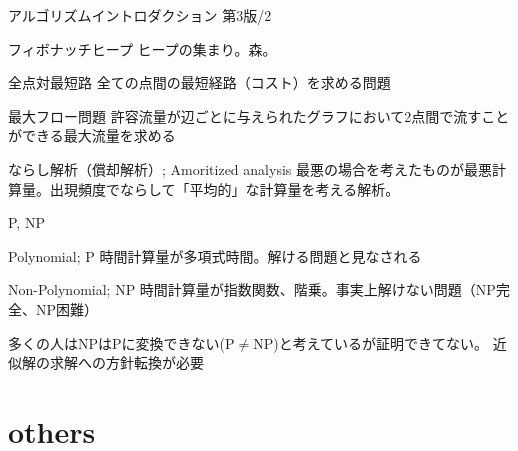 \documentclass{beamer}
\begin{document}
\begin{frame}[fragile]{アルゴリズムイントロダクション 第3版/2}{
\href{https://www.amazon.co.jp/アルゴリズムイントロダクション-第3版-総合版：世界標準MIT教科書-Thomas-Cormen-ebook/dp/B078WPYHGN/ref=sr_1_10}{}}

\begin{block}{フィボナッチヒープ}
ヒープの集まり。森。
\end{block}

\begin{block}{全点対最短路}
全ての点間の最短経路（コスト）を求める問題
\end{block}

\begin{block}{最大フロー問題}
許容流量が辺ごとに与えられたグラフにおいて2点間で流すことができる最大流量を求める
\end{block}

\begin{block}{ならし解析（償却解析）; Amoritized analysis}
最悪の場合を考えたものが最悪計算量。出現頻度でならして「平均的」な計算量を考える解析。
\end{block}

\end{frame}

\begin{frame}[fragile]{P, NP}{}
\begin{block}{Polynomial; P}
時間計算量が多項式時間。解ける問題と見なされる
\end{block}

\begin{block}{Non-Polynomial; NP}
時間計算量が指数関数、階乗。事実上解けない問題（NP完全、NP困難）
\end{block}

\vfill
多くの人はNPはPに変換できない(P$\neq$NP)と考えているが証明できてない。
\vfill
近似解の求解への方針転換が必要
\end{frame}


\section{others}		%
\subsection{}
\end{document}
